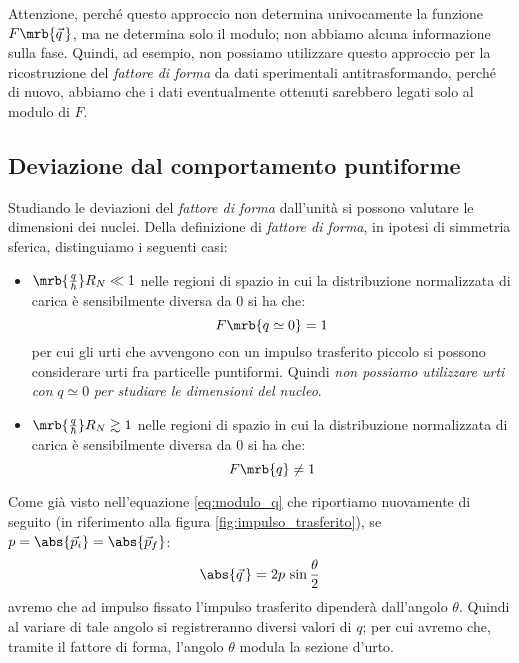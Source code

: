 \begin{note}[]
	Attenzione, perché questo approccio non determina univocamente
	la funzione $F\mrb{\vec{q}\,}$, ma ne determina solo il modulo; non abbiamo
	alcuna informazione sulla fase. Quindi, ad esempio, non possiamo utilizzare
	questo approccio per la ricostruzione del \textit{fattore di forma} da dati
	sperimentali antitrasformando, perché di nuovo, abbiamo che i dati
	eventualmente ottenuti sarebbero legati solo al modulo di $F$.
\end{note}

\subsection{Deviazione dal comportamento puntiforme}
Studiando le deviazioni del \textit{fattore di forma} dall'unità si possono
valutare le dimensioni dei nuclei.
Della definizione di \textit{fattore di forma},  in ipotesi di simmetria
sferica, distinguiamo i seguenti casi:
\begin{itemize}
	\item $\mrb{\frac{q}{\hbar}} R_N \ll 1$ nelle regioni di spazio in cui la
	      distribuzione normalizzata di carica è sensibilmente diversa da 0 si ha
	      che:
	      \begin{equation}
		      F\mrb{q \simeq 0} = 1
	      \end{equation}
	      per cui gli urti che avvengono con un impulso trasferito piccolo si possono
	      considerare urti fra particelle puntiformi. Quindi
	      \textit{non possiamo utilizzare urti con} $q \simeq 0$ \textit{per studiare
		      le dimensioni del nucleo}.
	\item $\mrb{\frac{q}{\hbar}} R_N \gtrsim 1$ nelle regioni di spazio in cui la
	      distribuzione normalizzata di carica è sensibilmente diversa da 0 si ha
	      che:
	      \begin{equation}
		      F\mrb{q} \neq 1
	      \end{equation}
\end{itemize}
Come già visto nell'equazione \ref{eq:modulo_q} che riportiamo nuovamente di
seguito (in riferimento alla figura \ref{fig:impulso_trasferito}), se $p =
	\abs{\vec{p}_i} = \abs{\vec{p}_f}$:
\begin{equation}
	\abs{\vec{q}\,} = 2p \, \sin\frac{\theta}{2}
\end{equation}
avremo che ad impulso fissato l'impulso trasferito dipenderà dall'angolo
$\theta$. Quindi al variare di tale angolo si registreranno diversi valori di
$q$; per cui avremo che, tramite il fattore di forma, l'angolo $\theta$ modula
la sezione d'urto.

